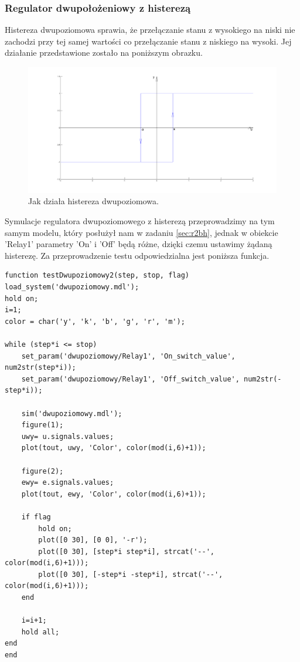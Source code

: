 \documentclass[a4paper,10pt]{article}
\begin{document}
\subsubsection{Regulator dwupołożeniowy z histerezą}\label{sec:r2h}

Histereza dwupoziomowa sprawia, że przełączanie stanu z wysokiego na niski nie zachodzi przy tej samej wartości co przełączanie stanu z niskiego na wysoki. Jej działanie przedstawione zostało na poniższym obrazku.

\begin{figure}[!h]
    \centering
	\includegraphics[width=120mm]{CW3-histereza-dwupoziomowa.png}
	\caption{Jak działa histereza dwupoziomowa.}
    \label{fig:Rysunek}
\end{figure}

Symulacje regulatora dwupoziomowego z histerezą przeprowadzimy na tym samym modelu, który posłużył nam w zadaniu \ref{sec:r2bh}, jednak w obiekcie 'Relay1' parametry 'On' i 'Off' będą różne, dzięki czemu ustawimy żądaną histerezę.\newpage
Za przeprowadzenie testu odpowiedzialna jest poniższa funkcja.

\begin{lstlisting}[caption=Funkcja testująca regulator dwupołożeniowy z histerezą.]
function testDwupoziomowy2(step, stop, flag)
load_system('dwupoziomowy.mdl');
hold on;
i=1;
color = char('y', 'k', 'b', 'g', 'r', 'm');

while (step*i <= stop)
    set_param('dwupoziomowy/Relay1', 'On_switch_value', num2str(step*i));
    set_param('dwupoziomowy/Relay1', 'Off_switch_value', num2str(-step*i));

    sim('dwupoziomowy.mdl');
    figure(1);
    uwy= u.signals.values;    
    plot(tout, uwy, 'Color', color(mod(i,6)+1));

    figure(2);
    ewy= e.signals.values;    
    plot(tout, ewy, 'Color', color(mod(i,6)+1));

    if flag
        hold on;
        plot([0 30], [0 0], '-r');
        plot([0 30], [step*i step*i], strcat('--', color(mod(i,6)+1)));
        plot([0 30], [-step*i -step*i], strcat('--', color(mod(i,6)+1)));
    end

    i=i+1;
    hold all;
end
end
\end{lstlisting}
\end{document}
